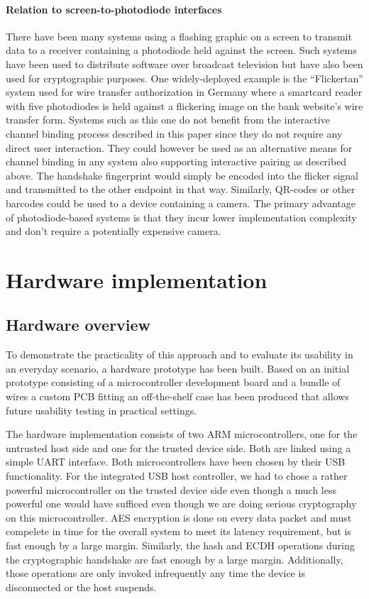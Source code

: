 \documentclass[12pt,a4paper,notitlepage]{article}
\begin{document}
\paragraph{Relation to screen-to-photodiode interfaces}
There have been many systems using a flashing graphic on a screen to transmit data to a receiver containing a photodiode
held against the screen. Such systems have been used to distribute software over broadcast television but have also been
used for cryptographic purposes. One widely-deployed example is the ``Flickertan'' system used for wire transfer
authorization in Germany where a smartcard reader with five photodiodes is held against a flickering image on the bank
website's wire transfer form\cite{schiermeier01,schiermeier02,braun01}. Systems such as this one do not benefit from the
interactive channel binding process described in this paper since they do not require any direct user interaction. They
could however be used as an alternative means for channel binding in any system also supporting interactive pairing as
described above. The handshake fingerprint would simply be encoded into the flicker signal and transmitted to the other
endpoint in that way.  Similarly, QR-codes or other barcodes could be used to a device containing a camera. The primary
advantage of photodiode-based systems is that they incur lower implementation complexity and don't require a potentially
expensive camera.

\section{Hardware implementation}
\subsection{Hardware overview}
To demonstrate the practicality of this approach and to evaluate its usability in an everyday scenario, a hardware
prototype has been built. Based on an initial prototype consisting of a microcontroller development board and a bundle
of wires a custom PCB fitting an off-the-shelf case has been produced that allows future %
usability testing in practical settings.

The hardware implementation consists of two ARM microcontrollers, one for the untrusted host side and one for the
trusted device side. Both are linked using a simple UART interface. Both microcontrollers have been chosen by their USB
functionality. For the integrated USB host controller, we had to chose a rather powerful microcontroller on the trusted
device side even though a much less powerful one would have sufficed even though we are doing serious cryptography on
this microcontroller. AES encryption is done on every data packet and must compelete in time for the overall system to
meet its latency requirement, %
but is fast enough by a large margin. %
Similarly, the hash and ECDH operations during the cryptographic handshake are fast enough by a large margin. %
Additionally, those operations are only invoked infrequently any time the device is disconnected or the host suspends.
\end{document}
